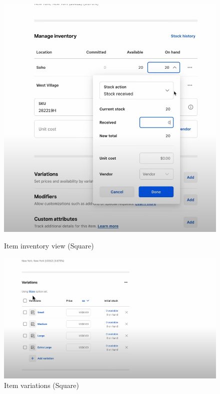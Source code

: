 \documentclass[]{VUMIFTemplateClass}
\begin{document}
\begin{figure}[h]
    \centering
    \begin{minipage}{0.48\textwidth}
        \centering
        \includegraphics[width=\textwidth]{images/examples/item_inventory_square.png}
        \caption{Item inventory view (Square)}
    \end{minipage}
    \hfill
    \begin{minipage}{0.48\textwidth}
        \centering
        \includegraphics[width=\textwidth]{images/examples/item_variations_square.png}
        \caption{Item variations (Square)}
    \end{minipage}
\end{figure}
\end{document}
